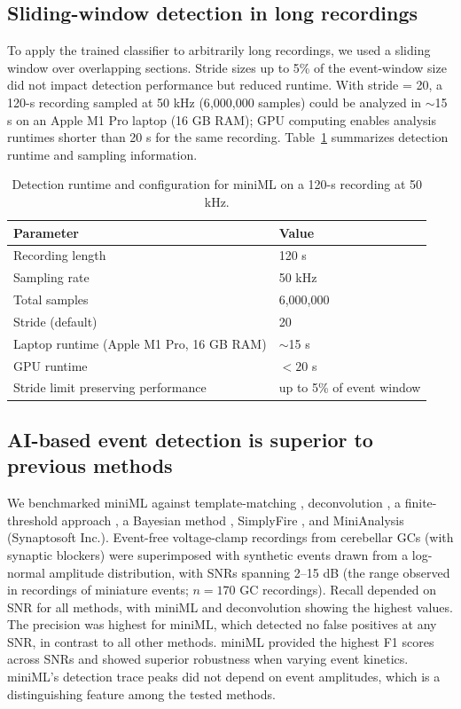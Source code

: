 \documentclass[9pt,lineno]{article}
\begin{document}
\subsection{Sliding-window detection in long recordings}

To apply the trained classifier to arbitrarily long recordings, we used a sliding window over overlapping sections. Stride sizes up to 5\% of the event-window size did not impact detection performance but reduced runtime. With stride = 20, a 120-s recording sampled at 50 kHz (6{,}000{,}000 samples) could be analyzed in $\sim$15 s on an Apple M1 Pro laptop (16 GB RAM); GPU computing enables analysis runtimes shorter than 20 s for the same recording. Table~\ref{tab:runtime} summarizes detection runtime and sampling information.

\begin{table}[ht]
\centering
\caption{Detection runtime and configuration for miniML on a 120-s recording at 50 kHz.}
\label{tab:runtime}
\begin{tabular}{ll}
\toprule
Parameter & Value \\
\midrule
Recording length & 120 s \\
Sampling rate & 50 kHz \\
Total samples & 6{,}000{,}000 \\
Stride (default) & 20 \\
Laptop runtime (Apple M1 Pro, 16 GB RAM) & $\sim$15 s \\
GPU runtime & $<20$ s \\
Stride limit preserving performance & up to 5\% of event window \\
\bottomrule
\end{tabular}
\end{table}

\subsection{AI-based event detection is superior to previous methods}

We benchmarked miniML against template-matching \citep{ClementsBekkers1997}, deconvolution \citep{PerniaAndrade2012}, a finite-threshold approach \citep{KudohTaguchi2002}, a Bayesian method \citep{Merel2016}, SimplyFire \citep{Mori2024}, and MiniAnalysis (Synaptosoft Inc.). Event-free voltage-clamp recordings from cerebellar GCs (with synaptic blockers) were superimposed with synthetic events drawn from a log-normal amplitude distribution, with SNRs spanning 2--15 dB (the range observed in recordings of miniature events; $n=170$ GC recordings). Recall depended on SNR for all methods, with miniML and deconvolution showing the highest values. The precision was highest for miniML, which detected no false positives at any SNR, in contrast to all other methods. miniML provided the highest F1 scores across SNRs and showed superior robustness when varying event kinetics. miniML's detection trace peaks did not depend on event amplitudes, which is a distinguishing feature among the tested methods.
\end{document}
